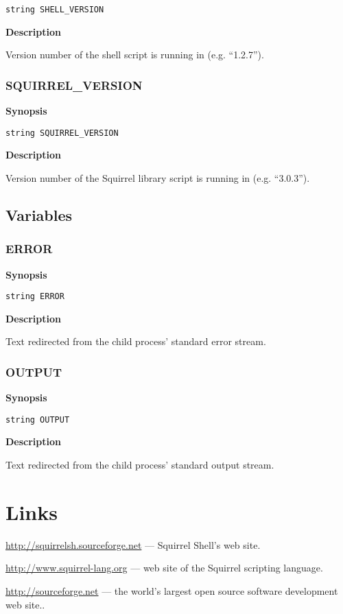 \documentclass[a4paper, 10pt, titlepage]{article}
\begin{document}
\begin{verbatim}
string SHELL_VERSION
\end{verbatim}

\textbf{Description}

Version number of the shell script is running in (e.g. ``1.2.7'').

\subsubsection{SQUIRREL\_VERSION}

\textbf{Synopsis}

\begin{verbatim}
string SQUIRREL_VERSION
\end{verbatim}

\textbf{Description}

Version number of the  Squirrel library script is running in (e.g. ``3.0.3'').

\subsection{Variables}

\subsubsection{ERROR}

\textbf{Synopsis}

\begin{verbatim}
string ERROR
\end{verbatim}

\textbf{Description}

Text redirected from the child process' standard error stream.

\subsubsection{OUTPUT}

\textbf{Synopsis}

\begin{verbatim}
string OUTPUT
\end{verbatim}

\textbf{Description}

Text redirected from the child process' standard output stream.

\section{Links}

\url{http://squirrelsh.sourceforge.net} --- Squirrel Shell's web site.

\url{http://www.squirrel-lang.org} --- web site of the Squirrel scripting language.

\url{http://sourceforge.net} --- the world's largest open source software development web site..
\end{document}
